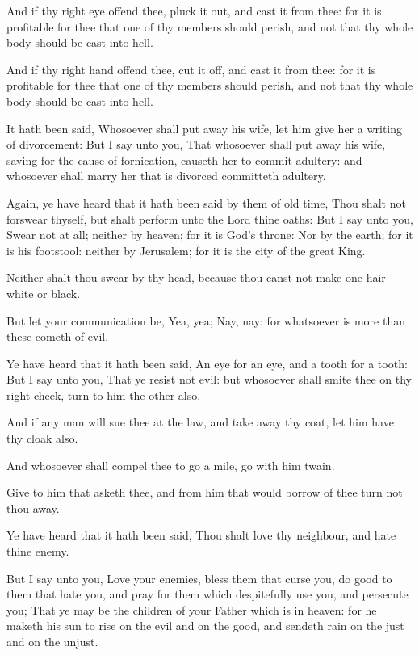 \verse And if thy right eye offend thee, pluck it out, and cast it from thee: for it is profitable for thee that one of thy members should perish, and not that thy whole body should be cast into hell.

\verse And if thy right hand offend thee, cut it off, and cast it from thee: for it is profitable for thee that one of thy members should perish, and not that thy whole body should be cast into hell.

\verse It hath been said, Whosoever shall put away his wife, let him give her a writing of divorcement: \verse But I say unto you, That whosoever shall put away his wife, saving for the cause of fornication, causeth her to commit adultery: and whosoever shall marry her that is divorced committeth adultery.

\verse Again, ye have heard that it hath been said by them of old time, Thou shalt not forswear thyself, but shalt perform unto the Lord thine oaths: \verse But I say unto you, Swear not at all; neither by heaven; for it is God's throne: \verse Nor by the earth; for it is his footstool: neither by Jerusalem; for it is the city of the great King.

\verse Neither shalt thou swear by thy head, because thou canst not make one hair white or black.

\verse But let your communication be, Yea, yea; Nay, nay: for whatsoever is more than these cometh of evil.

\verse Ye have heard that it hath been said, An eye for an eye, and a tooth for a tooth: \verse But I say unto you, That ye resist not evil: but whosoever shall smite thee on thy right cheek, turn to him the other also.

\verse And if any man will sue thee at the law, and take away thy coat, let him have thy cloak also.

\verse And whosoever shall compel thee to go a mile, go with him twain.

\verse Give to him that asketh thee, and from him that would borrow of thee turn not thou away.

\verse Ye have heard that it hath been said, Thou shalt love thy neighbour, and hate thine enemy.

\verse But I say unto you, Love your enemies, bless them that curse you, do good to them that hate you, and pray for them which despitefully use you, and persecute you; \verse That ye may be the children of your Father which is in heaven: for he maketh his sun to rise on the evil and on the good, and sendeth rain on the just and on the unjust.

